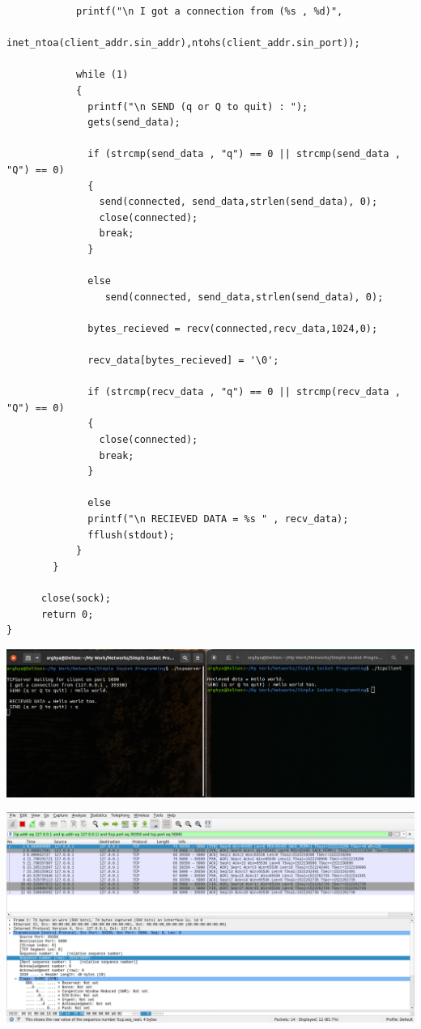 \documentclass{article}
\begin{document}
\begin{enumerate}
\begin{lstlisting}
            printf("\n I got a connection from (%s , %d)",
                   inet_ntoa(client_addr.sin_addr),ntohs(client_addr.sin_port));

            while (1)
            {
              printf("\n SEND (q or Q to quit) : ");
              gets(send_data);
              
              if (strcmp(send_data , "q") == 0 || strcmp(send_data , "Q") == 0)
              {
                send(connected, send_data,strlen(send_data), 0); 
                close(connected);
                break;
              }
               
              else
                 send(connected, send_data,strlen(send_data), 0);  

              bytes_recieved = recv(connected,recv_data,1024,0);

              recv_data[bytes_recieved] = '\0';

              if (strcmp(recv_data , "q") == 0 || strcmp(recv_data , "Q") == 0)
              {
                close(connected);
                break;
              }

              else 
              printf("\n RECIEVED DATA = %s " , recv_data);
              fflush(stdout);
            }
        }       

      close(sock);
      return 0;
} 
\end{lstlisting}

\includegraphics[width=700pt]{Question11}

\includegraphics[width=700pt]{Question12}
\pagebreak


\end{enumerate}
\end{document}
